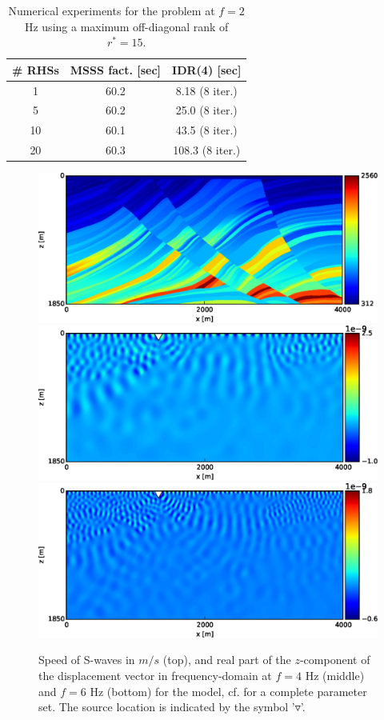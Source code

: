  \begin{table}[H]
 \caption{Numerical experiments for the \marmousi problem at $f=2$ Hz using a maximum off-diagonal rank of $r^\ast=15$.} \label{tab_mar2}
  \centering
  \begin{tabular}{|c|c|c|}
  \hline
   \# RHSs & MSSS fact. [sec] & IDR(4) [sec]\\
   \hline
   1 & 60.2 & \phantom{0}8.18  (8 iter.) \\
   5 & 60.2 & \phantom{0}25.0 (8 iter.) \\
   10 & 60.1  &\phantom{0}43.5 (8 iter.)\\
   20 & 60.3 &  108.3 (8 iter.) \\
   \hline
  \end{tabular}
 \end{table}

\begin{figure}[H]
  \includegraphics[width=0.98\columnwidth]{cs-crop.eps}\\
  \includegraphics[width=0.98\columnwidth]{disp_z10_f4-crop.eps}\\
  \includegraphics[width=0.98\columnwidth]{disp_z10_f6-crop.eps}

\caption{Speed of S-waves in $m/s$ (top), and real part of the $z$-component of the displacement vector in frequency-domain at $f=4$ Hz (middle) and $f=6$ Hz (bottom) for the \marmousi model, cf. \cite{marm2} for a complete parameter set. The source location is indicated by the symbol '$\triangledown$'.}
\label{fig:marm}
\end{figure}

